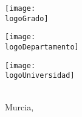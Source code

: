 \begin{titlepage}
\noindent\hspace*{\centeroffset}
\begin{minipage}{\textwidth}
\centering
\noindent\hspace*{\centeroffset}
\begin{center}
{\texttt{[image: \\logoGrado]}}\\
{\raggedleft\miGrado}
\end{center}
\vspace*{2em}
\centering
\noindent\hspace*{\centeroffset}
\begin{minipage}[l]{6cm}
\texttt{[image: \\logoDepartamento]}
\end{minipage}
\begin{minipage}[r]{6cm}
\texttt{[image: \\logoUniversidad]}
\end{minipage}
\\[1cm]
Murcia, \Hoy
\end{minipage}


\end{titlepage}

\restoregeometry


